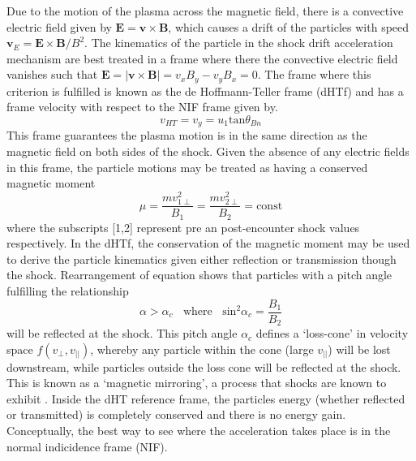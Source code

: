 Due to the motion of the plasma across the magnetic field, there is a convective electric field given by $\mathbf{E} = \mathbf{v}\times \mathbf{B}$, which causes a drift of the particles with speed $\mathbf{v}_E = \mathbf{E}\times \mathbf{B}/B^2$. The kinematics of the particle in the shock drift acceleration mechanism are best treated in a frame where there the convective electric field vanishes such that $\mathbf{E} = |\mathbf{v}\times \mathbf{B}|=v_x B_y - v_yB_x = 0$. The frame where this criterion is fulfilled is known as the de Hoffmann-Teller frame (dHTf) and has a frame velocity with respect to the NIF frame given by. 
\begin{equation}
v_{HT} = v_y = u_1\mathrm{tan}\theta_{Bn}
\end{equation}
This frame guarantees the plasma motion is in the same direction as the magnetic field on both sides of the shock. Given the absence of any electric fields in this frame, the particle motions may be treated as having a conserved magnetic moment
\begin{equation}
\mu = \frac{mv^2_{1\perp}}{B_1} = \frac{mv^2_{2\perp}}{B_2} = \mathrm{const}
\label{eqn:ad_in}
\end{equation}
where the subscripts [1,2] represent pre an post-encounter shock values respectively. In the dHTf, the conservation of the magnetic moment may be used to derive the particle kinematics given either reflection or transmission though the shock. Rearrangement of equation \label{eqn:ad_in} shows that particles with a pitch angle fulfilling the relationship
\begin{equation}
\alpha > \alpha_c~~~~\mathrm{where}~~~~\mathrm{sin}^2\alpha_c = \frac{B_1}{B_2}
\end{equation}
will be reflected at the shock. This pitch angle $\alpha_c$ defines a \textquoteleft loss-cone' in velocity space $f(v_{\perp}, v_{||})$, whereby any particle within the cone (large $v_{||}$) will be lost downstream, while particles outside the loss cone will be reflected at the shock. This is known as a \textquoteleft magnetic mirroring', a process that shocks are known to exhibit \citep{feldman1983}. Inside the dHT reference frame, the particles energy (whether reflected or transmitted) is completely conserved and there is no energy gain. Conceptually, the best way to see where the acceleration takes place is in the normal indicidence frame (NIF).

